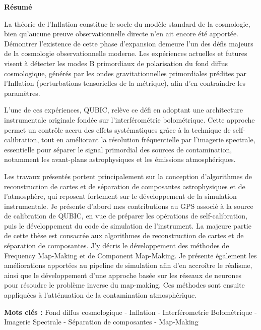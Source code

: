 \hspace{5cm} \textbf{\Huge Résumé}

\vspace{1cm}

La théorie de l’Inflation constitue le socle du modèle standard de la cosmologie, bien qu’aucune preuve observationnelle directe n’en ait encore été apportée. Démontrer l’existence de cette phase d’expansion demeure l’un des défis majeurs de la cosmologie observationnelle moderne. Les expériences actuelles et futures visent à détecter les modes B primordiaux de polarisation du fond diffus cosmologique, générés par les ondes gravitationnelles primordiales prédites par l’Inflation (perturbations tensorielles de la métrique), afin d’en contraindre les paramètres.

L’une de ces expériences, QUBIC, relève ce défi en adoptant une architecture instrumentale originale fondée sur l’interférométrie bolométrique. Cette approche permet un contrôle accru des effets systématiques grâce à la technique de self-calibration, tout en améliorant la résolution fréquentielle par l’imagerie spectrale, essentielle pour séparer le signal primordial des sources de contamination, notamment les avant-plans astrophysiques et les émissions atmosphériques.

Les travaux présentés portent principalement sur la conception d’algorithmes de reconstruction de cartes et de séparation de composantes astrophysiques et de l’atmosphère, qui reposent fortement sur le développement de la simulation instrumentale. Je présente d’abord mes contributions au GPS associé à la source de calibration de QUBIC, en vue de préparer les opérations de self-calibration, puis le développement du code de simulation de l’instrument. La majeure partie de cette thèse est consacrée aux algorithmes de reconstruction de cartes et de séparation de composantes. J’y décris le développement des méthodes de Frequency Map-Making et de Component Map-Making. Je présente également les améliorations apportées au pipeline de simulation afin d’en accroître le réalisme, ainsi que le développement d’une approche basée sur les réseaux de neurones pour résoudre le problème inverse du map-making. Ces méthodes sont ensuite appliquées à l’atténuation de la contamination atmosphérique.


\vspace{0.5cm}

\textbf{Mots clés :} Fond diffus cosmologique - Inflation - Interférometrie Bolométrique - Imagerie Spectrale - Séparation de composantes - Map-Making

